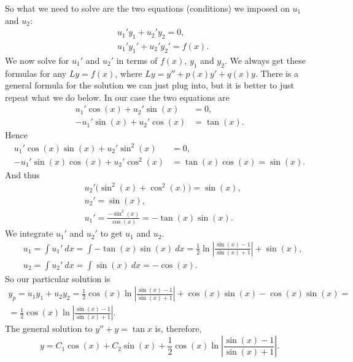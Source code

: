 So what we need to solve are the two equations (conditions) we imposed
on $u_1$ and $u_2$:
\begin{equation*}
\boxed{~~
\begin{aligned}
& u_1' y_1 + u_2' y_2 = 0 ,\\
& u_1' y_1' + u_2' y_2' = f(x) .
\end{aligned}
~~}
\end{equation*}
We now solve for $u_1'$ and $u_2'$ in terms of $f(x)$, $y_1$ and $y_2$.
We always get these formulas for any $Ly = f(x)$, where $Ly =
y''+p(x)y'+q(x)y$.  There is a general
formula for the solution we can just plug into, but it is better to
just repeat what we do below.  In our case the two equations are
\begin{align*}
u_1' \cos (x) + u_2' \sin (x) &= 0 ,\\
-u_1' \sin (x) + u_2' \cos (x) &= \tan (x) .
\end{align*}
Hence
\begin{align*}
u_1' \cos (x) \sin (x) + u_2' \sin^2 (x) & = 0 ,\\
-u_1' \sin (x) \cos (x) + u_2' \cos^2 (x) & = \tan (x) \cos (x) = \sin (x) .
\end{align*}
And thus
\begin{align*}
& u_2' \bigl(\sin^2 (x) + \cos^2 (x)\bigr) = \sin (x) , \\
& u_2' = \sin (x) , \\
& u_1' = \frac{- \sin^2 (x)}{\cos (x)} = - \tan (x) \sin (x) .
\end{align*}
We integrate $u_1'$ and $u_2'$ to get $u_1$ and $u_2$.
\begin{align*}
& u_1 = \int u_1'~dx 
= \int - \tan (x) \sin (x)~dx
= \frac{1}{2}
\ln \left\lvert \frac{\sin (x)-1}{\sin (x) + 1} \right\rvert
+ \sin (x) , \\
& u_2 = \int u_2'~dx 
= \int \sin (x)~dx = -\cos (x) .
\end{align*}
So our particular solution is
\begin{multline*}
y_p = u_1 y_1 + u_2 y_2 =
\frac{1}{2} \cos (x) \ln \left\lvert \frac{\sin (x)-1}{\sin (x) + 1}
\right\rvert
+ \cos (x) \sin (x)
-\cos (x) \sin (x)
= \\ =
\frac{1}{2} \cos (x) \ln \left\lvert \frac{\sin (x)-1}{\sin (x) + 1}
\right\rvert .
\end{multline*}
The general solution to $y'' + y = \tan x$ is, therefore,
\begin{equation*}
y = C_1 \cos (x) + C_2 \sin (x) +
\frac{1}{2} \cos (x) \ln \left\lvert \frac{\sin (x)-1}{\sin (x) + 1}
\right\rvert .
\end{equation*}


